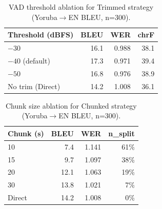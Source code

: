 
\begin{table}[t]
\centering
\small
\caption{VAD threshold ablation for Trimmed strategy (Yoruba$\to$EN BLEU, n=300).}
\label{tab:vad_ablation}
\begin{tabular}{lrrr}
\toprule
\textbf{Threshold (dBFS)} & \textbf{BLEU} & \textbf{WER} & \textbf{chrF} \\
\midrule
$-30$ & 16.1 & 0.988 & 38.1 \\
$-40$ (default) & 17.3 & 0.971 & 39.4 \\
$-50$ & 16.8 & 0.976 & 38.9 \\
No trim (Direct) & 14.2 & 1.008 & 36.1 \\
\bottomrule
\end{tabular}
\end{table}

\begin{table}[t]
\centering
\small
\caption{Chunk size ablation for Chunked strategy (Yoruba$\to$EN BLEU, n=300).}
\label{tab:chunk_ablation}
\begin{tabular}{lrrr}
\toprule
\textbf{Chunk (s)} & \textbf{BLEU} & \textbf{WER} & \textbf{n\_split} \\
\midrule
10 & 7.4 & 1.141 & 61\% \\
15 & 9.7 & 1.097 & 38\% \\
20 & 12.1 & 1.063 & 19\% \\
30 & 13.8 & 1.021 &  7\% \\
Direct & 14.2 & 1.008 &  0\% \\
\bottomrule
\end{tabular}
\end{table}
